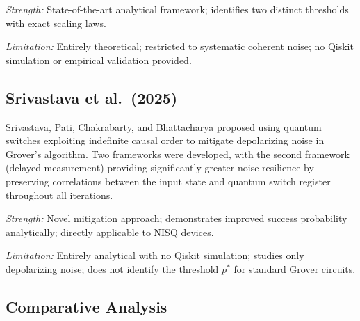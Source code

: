 \documentclass[12pt, a4paper]{article}
\begin{document}
\textit{Strength:} State-of-the-art analytical framework; identifies two distinct
thresholds with exact scaling laws.

\textit{Limitation:} Entirely theoretical; restricted to systematic coherent noise;
no Qiskit simulation or empirical validation provided.

\subsection*{Srivastava et al.\ (2025)}

Srivastava, Pati, Chakrabarty, and Bhattacharya proposed using quantum switches
exploiting indefinite causal order to mitigate depolarizing noise in Grover's
algorithm. Two frameworks were developed, with the second framework (delayed
measurement) providing significantly greater noise resilience by preserving
correlations between the input state and quantum switch register throughout all
iterations.

\textit{Strength:} Novel mitigation approach; demonstrates improved success
probability analytically; directly applicable to NISQ devices.

\textit{Limitation:} Entirely analytical with no Qiskit simulation; studies only
depolarizing noise; does not identify the threshold $p^{*}$ for standard Grover
circuits.

\vspace{8pt}

\subsection*{Comparative Analysis}

\vspace{4pt}
\begin{table}[htbp]
\centering
{}
\end{table}
\end{document}
